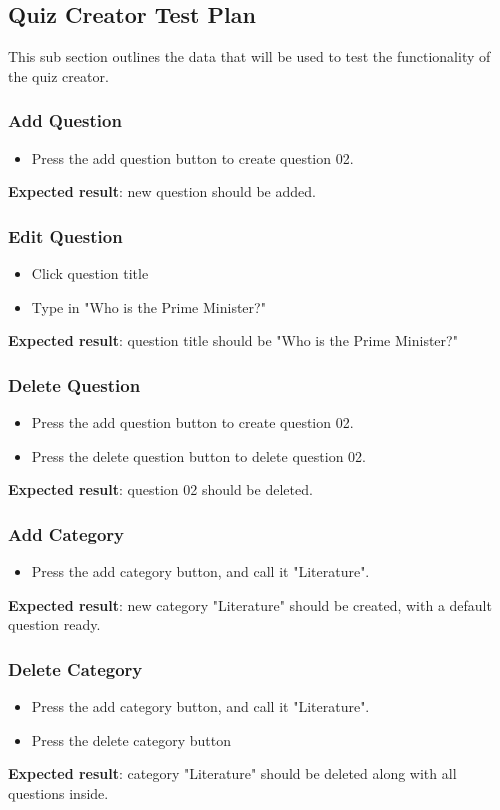 \subsection{Quiz Creator Test Plan}
This sub section outlines the data that will be used to test the functionality of the quiz creator.

\subsubsection{Add Question}
\begin{itemize}
\item Press the add question button to create question 02.
\end{itemize}
\textbf{Expected result}: new question should be added.

\subsubsection{Edit Question}
\begin{itemize}
\item Click question title
\item Type in "Who is the Prime Minister?"
\end{itemize}
\textbf{Expected result}: question title should be "Who is the Prime Minister?"

\subsubsection{Delete Question}
\begin{itemize}
\item Press the add question button to create question 02.
\item Press the delete question button to delete question 02.
\end{itemize}
\textbf{Expected result}: question 02 should be deleted.

\subsubsection{Add Category}
\begin{itemize}
\item Press the add category button, and call it "Literature".
\end{itemize}
\textbf{Expected result}: new category "Literature" should be created, with a default question ready.

\subsubsection{Delete Category}
\begin{itemize}
\item Press the add category button, and call it "Literature".
\item Press the delete category button
\end{itemize}
\textbf{Expected result}: category "Literature" should be deleted along with all questions inside.

